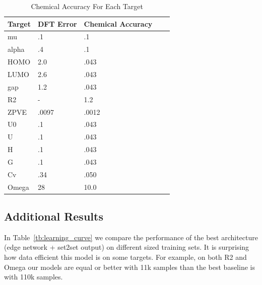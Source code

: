 \documentclass{article}
\begin{document}
\begin{table}[t]
\centering
\caption{Chemical Accuracy For Each Target}
\label{tb:chem_MAE}
\begin{tabular}{lllll}
\hline
Target & DFT Error  & Chemical Accuracy \\
\hline

mu     & .1 & .1         \\
alpha  & .4 & .1           \\
HOMO   & 2.0 & .043          \\
LUMO   & 2.6 & .043       \\
gap    & 1.2 & .043        \\
R2     & - & 1.2         \\
ZPVE   & .0097 & .0012        \\
U0     & .1 & .043         \\
U      & .1 & .043           \\
H      & .1 &.043          \\
G      & .1 & .043      \\
Cv     & .34 & .050        \\
Omega  & 28 & 10.0          \\
\end{tabular}
\end{table}

\subsection{Additional Results}

In Table~\ref{tb:learning_curve} we compare the performance of the best architecture (edge network + set2set output) on different sized training sets. It is surprising how data efficient this model is on some targets. For example, on both R2 and Omega our models are equal or better with 11k samples than the best baseline is with 110k samples.
\end{document}
